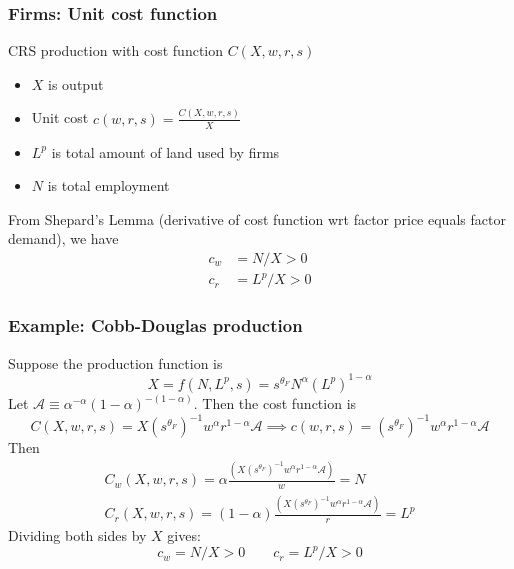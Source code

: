 \documentclass[11pt,notes=hide,aspectratio=169]{beamer}
\begin{document}
\begin{frame}
\frametitle{Firms: Unit cost function}
CRS production with cost function $C(X, w,r,s)$ 
\begin{itemize}
\item  $X$ is output
\item Unit cost $c(w, r, s)=\frac{C(X,w,r,s)}{X}$
\item $L^p$ is total amount of land used by firms
\item $N$ is total employment \medskip
\end{itemize}
From Shepard's Lemma (derivative of cost function wrt factor price equals factor demand), we have
\begin{align*}
c_w &= N/X >0 \\
c_r &= L^p/X >0
\end{align*}
\end{frame}
\begin{frame}
\frametitle{Example: Cobb-Douglas production}
Suppose the production function is
$$X=f(N,L^p,s)= s^{\theta_F} N^\alpha (L^p)^{1-\alpha}$$
Let $\mathcal{A} \equiv \alpha^{-\alpha} (1-\alpha)^{-(1-\alpha)}$.
Then the cost function is
\begin{equation*}
C(X,w,r,s) 
= X (s^{\theta_F})^{-1}w^\alpha r^{1-\alpha} \mathcal{A}
\implies
c(w,r,s)
=(s^{\theta_F})^{-1}w^\alpha r^{1-\alpha} \mathcal{A}
\end{equation*}
Then 
\begin{align*}
C_w(X,w,r,s) = \alpha \frac{\left(X (s^{\theta_F})^{-1}w^\alpha r^{1-\alpha} \mathcal{A} \right)}{w} = N \\
C_r(X,w,r,s) = (1-\alpha) \frac{\left(X (s^{\theta_F})^{-1}w^\alpha r^{1-\alpha} \mathcal{A} \right)}{r} = L^p
\end{align*}
Dividing both sides by $X$ gives:
\begin{equation*}
c_w = N/X >0
\qquad
c_r = L^p/X >0
\end{equation*}
\end{frame}
\end{document}
